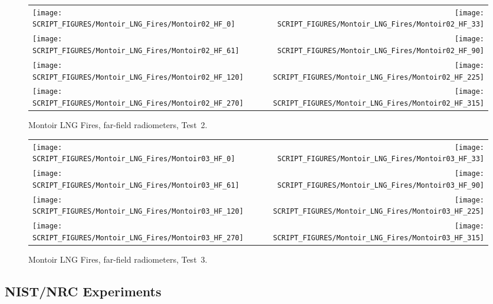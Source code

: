 \begin{figure}[p]
\begin{tabular*}{\textwidth}{l@{\extracolsep{\fill}}r}
\texttt{[image: SCRIPT\_FIGURES/Montoir\_LNG\_Fires/Montoir02\_HF\_0]} &
\texttt{[image: SCRIPT\_FIGURES/Montoir\_LNG\_Fires/Montoir02\_HF\_33]} \\
\texttt{[image: SCRIPT\_FIGURES/Montoir\_LNG\_Fires/Montoir02\_HF\_61]} &
\texttt{[image: SCRIPT\_FIGURES/Montoir\_LNG\_Fires/Montoir02\_HF\_90]} \\
\texttt{[image: SCRIPT\_FIGURES/Montoir\_LNG\_Fires/Montoir02\_HF\_120]} &
\texttt{[image: SCRIPT\_FIGURES/Montoir\_LNG\_Fires/Montoir02\_HF\_225]} \\
\texttt{[image: SCRIPT\_FIGURES/Montoir\_LNG\_Fires/Montoir02\_HF\_270]} &
\texttt{[image: SCRIPT\_FIGURES/Montoir\_LNG\_Fires/Montoir02\_HF\_315]}
\end{tabular*}
\caption[Montoir LNG Fires, far-field radiometers, Test~2]{Montoir LNG Fires, far-field radiometers, Test~2.}
\label{Montoir_HF_2}
\end{figure}

\begin{figure}[p]
\begin{tabular*}{\textwidth}{l@{\extracolsep{\fill}}r}
\texttt{[image: SCRIPT\_FIGURES/Montoir\_LNG\_Fires/Montoir03\_HF\_0]} &
\texttt{[image: SCRIPT\_FIGURES/Montoir\_LNG\_Fires/Montoir03\_HF\_33]} \\
\texttt{[image: SCRIPT\_FIGURES/Montoir\_LNG\_Fires/Montoir03\_HF\_61]} &
\texttt{[image: SCRIPT\_FIGURES/Montoir\_LNG\_Fires/Montoir03\_HF\_90]} \\
\texttt{[image: SCRIPT\_FIGURES/Montoir\_LNG\_Fires/Montoir03\_HF\_120]} &
\texttt{[image: SCRIPT\_FIGURES/Montoir\_LNG\_Fires/Montoir03\_HF\_225]} \\
\texttt{[image: SCRIPT\_FIGURES/Montoir\_LNG\_Fires/Montoir03\_HF\_270]} &
\texttt{[image: SCRIPT\_FIGURES/Montoir\_LNG\_Fires/Montoir03\_HF\_315]}
\end{tabular*}
\caption[Montoir LNG Fires, far-field radiometers, Test~3]{Montoir LNG Fires, far-field radiometers, Test~3.}
\label{Montoir_HF_3}
\end{figure}



\clearpage

\subsection{NIST/NRC Experiments}

